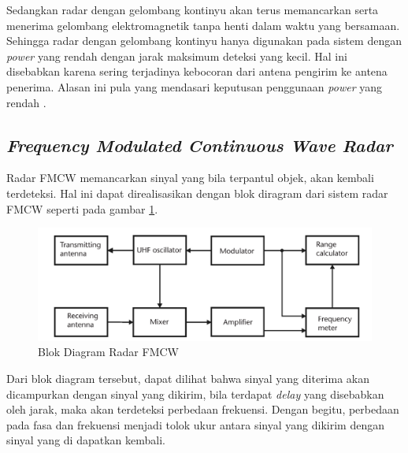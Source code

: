 Sedangkan radar dengan gelombang kontinyu akan terus memancarkan serta menerima gelombang elektromagnetik tanpa henti dalam waktu yang bersamaan. Sehingga radar dengan gelombang kontinyu hanya digunakan pada sistem dengan \textit{power} yang rendah dengan jarak maksimum deteksi yang kecil. Hal ini disebabkan karena sering terjadinya kebocoran dari antena pengirim ke antena penerima. Alasan ini pula yang mendasari keputusan penggunaan \textit{power} yang rendah \cite{Scheer2015}.

\subsection{\textit{Frequency Modulated Continuous Wave Radar}}

Radar FMCW memancarkan sinyal yang bila terpantul objek, akan kembali terdeteksi. Hal ini dapat direalisasikan dengan blok diragram dari sistem radar FMCW seperti pada gambar \ref{pic:FMCWBlock}.  

\begin{figure}
	\begin{center}
		\includegraphics[scale=0.3]{pics/bab2/blokDiagramFMCW.png}
		\caption[Blok Diagram Radar FMCW]{Blok Diagram Radar FMCW}
		\label{pic:FMCWBlock}
	\end{center}
\end{figure}

Dari blok diagram tersebut, dapat dilihat bahwa sinyal yang diterima akan dicampurkan dengan sinyal yang dikirim, bila terdapat \textit{delay} yang disebabkan oleh jarak, maka akan terdeteksi perbedaan frekuensi. Dengan begitu, perbedaan pada fasa dan frekuensi menjadi tolok ukur antara sinyal yang dikirim dengan sinyal yang di dapatkan kembali.


